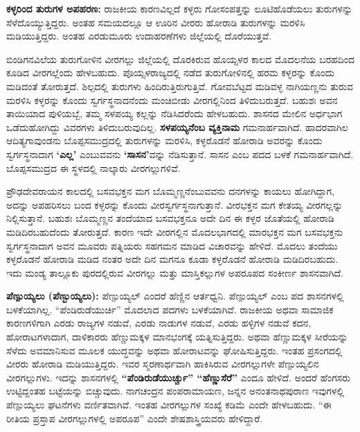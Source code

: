 \textbf{ಕಳ್ಳರಿಂದ ತುರುಗಳ ಅಪಹರಣ: } ರಾಜಕೀಯ ಕಾರಣವಿಲ್ಲದೆ ಕಳ್ಳರು ಗೋಸಂಪತ್ತನ್ನು ಲೂಟಿಹೊಡೆಯಲು ತುರುಗಳನ್ನು ಸೆಳೆದೊಯ್ಯುತ್ತಿದ್ದರು. ಅಂತಹ ಸಮಯದಲ್ಲೂ ಆ ಊರಿನ ವೀರರು ಹೋರಾಡಿ ತುರುಗಳನ್ನು ಮರಳಿಸಿ ಮಡಿಯುತ್ತಿದ್ದರು. ಅಂತಹ ಎರಡುಮೂರು ಉದಾಹರಣೆಗಳು ಜಿಲ್ಲೆಯಲ್ಲಿ ದೊರೆಯುತ್ತವೆ.

ಬಿಂಡಿಗನವಿಲೆಯ ತುರುಗೋಳಿನ ವೀರಗಲ್ಲು ಜಿಲ್ಲೆಯಲ್ಲಿ ದೊರಕಿರುವ ಹೊಯ್ಸಳರ ಕಾಲದ ಮೊದಲನೆಯ ಬರಹದಿಂದ ಕೂಡಿದ ವೀರಗಲ್ಲೆಂದು ಹೇಳಬಹುದು. ಪೊಯ್ಸಳರಾಜ್ಯದಲ್ಲಿ ನಡೆದ ತುರುಗೋಳಿನಲ್ಲಿ ಹರಮ ಕಳ್ಳರನ್ನು ಕೊಂದು ಮಡಿದಂತೆ ತೋರುತ್ತದೆ. ಶಿಲ್ಪದಲ್ಲಿ ತುರುಗಳು ಹಿಂದಿರುತ್ತಿರುಗುತ್ತಿವೆ. ಗೋವಬೆಟ್ಟದ ಮಡಿವಳ್ಳ ನಾಗಿಯಣ್ಣನು ತುರುವ ಮರಳಿಸಿ ಕಳ್ಳರನ್ನು ಕೊಂದು ಸ್ವರ್ಗಸ್ಥನಾದನೆಂದು ಮಂಚಿಬೀಡು ವೀರಗಲ್ಲಿನಿಂದ ತಿಳಿದುಬರುತ್ತದೆ. ಬಹುಶಃ ಅವನ ತಾಯಿಯಾದ ಪುಳಿಯಬ್ಬೆ, ತಮ್ಮ ಸಳಪಯ್ಯ ಕಲ್ಲನ್ನು ನೆಡಿಸಿದರೆಂದು ಹೇಳಬಹುದು. ಶಾಸನದ ಮೇಲಿನ ಅರ್ಧಭಾಗ ಒಡೆದುಹೋಗಿದ್ದು ವಿವರಗಳು ತಿಳಿದುಬರುವುದಿಲ್ಲ. \textbf{ಸಳಪಯ್ಯನೆಂಬ ವ್ಯಕ್ತಿನಾಮ} ಗಮನಾರ್ಹವಾಗಿದೆ. ಹಾದರವಾಗಿಲ ಆದಿತ್ಯಗಾವುಂಡನು ಬೊಪ್ಪಸಮುದ್ರದಲ್ಲಿ ತುರುಗಳನ್ನು ಮರಳಿಸಿ, ಕಳ್ಳರೊಡನೆ ಹೋರಾಡಿ ಅವರನ್ನು ಕೊಂದು ಸ್ವರ್ಗಸ್ಥನಾದಾಗ \textbf{‘ಎಲ್ಲ’} ಎಂಬುವವನು \textbf{‘ಸಾಸನ’}ವನ್ನು ನೆಡಿಸುತ್ತಾನೆ. ಸಾಸನ ಎಂಬ ಪದದ ಬಳಕೆ ಗಮನಾರ್ಹವಾಗಿದೆ. ಬೊಪ್ಪಸಮುದ್ರದ ಈ ಸ್ಥಳದಲ್ಲಿ ನಾಲ್ಕಾರು ವೀರಗಲ್ಲುಗಳಿವೆ.

ಪ್ರೌಢದೇವರಾಯನ ಕಾಲದಲ್ಲಿ ಬಸವಭಕ್ತನ ಮಗ ಬೊಮ್ಮಣ್ಣನೆಂಬುವವನು ದನಗಳನ್ನು ಕಾಯಲು ಹೋಗಿದ್ದಾಗ, ಅದನ್ನು ಅಪಹರಿಸಲು ಬಂದ ಕಳ್ಳರನ್ನು ಕೊಂದು ವೀರಸ್ವರ್ಗಸ್ಥನಾಗುತ್ತಾನೆ. ವೀರಭಕ್ತನ ಮಗ ಕೇತಯ್ಯ ವೀರಗಲ್ಲನ್ನು ನಿಲ್ಲಿಸುತ್ತಾನೆ. ಬಹುಶಃ ಬೊಮ್ಮಣ್ಣನ ತಂದೆಯಾದ ಬಸವಭಕ್ತನೂ ಅದೇ ದಿನ ಈ ಕಳ್ಳರ ಜೊತೆಯಲ್ಲಿ ಹೋರಾಡಿ ಮಡಿದಿರಬಹುದೆಂದು ತೋರುತ್ತದೆ. ಕಾರಣ ಇದೇ ವೀರಗಲ್ಲಿನ ಮೊದಲಭಾಗದಲ್ಲಿ ಮಾರಭಕ್ತನ ಮಗ ಬಸವಭಕ್ತನು ಸ್ವರ್ಗಸ್ಥನಾದಾಗ ಅವನ ಮೂವರು ಪತ್ನಿಯರು ಸಹಗಮನ ಮಾಡಿದ ವಿಚಾರವನ್ನು ಹೇಳಿದೆ. ಮೊದಲು ತಂದೆಯು ಕಳ್ಳರೊಡನೆ ಹೋರಾಡಿ ಮಡಿದ ನಂತರ ಅದೇ ದಿನ ಮಗನೂ ಕೂಡಾ ಕಳ್ಳರೊಡನೆ ಹೋರಾಡಿ ಮಡಿದಿರಬಹುದು. ಇದು ಮಂಡ್ಯ ತಾಲ್ಲೂಕು ಪುರದಲ್ಲಿರುವ ವೀರಗಲ್ಲು ಮತ್ತು ಮಾಸ್ತಿಕಲ್ಲುಗಳ ಅಪರೂಪದ ಸಂಕೀರ್ಣ ಶಾಸನವಾಗಿದೆ.

\textbf{ಪೆಣ್ಪುಯ್ಯಲು (ಪೆಣ್ಬುಯ್ಯಲು): } ಪೆಣ್ಪುಯ್ಯಲ್​ ಎಂದರೆ ಹೆಣ್ಣಿನ ಆರ್ತಧ್ವನಿ. ಪೆಣ್ಪುಯ್ಯಲ್​ ಎಂಬ ಪದ ಶಾಸನಗಳಲ್ಲಿ ಬಳಕೆಯಾಗಿಲ್ಲ. “ಪೆಂಡಿರುಡೆಯುರ್ಚಿ” ಮೊದಲಾದ ಪದಗಳು ಬಳಕೆಯಾಗಿವೆ. ರಾಜಕೀಯ ಅಥವಾ ಸಾಮಾಜಿಕ ಕಾರಣಗಳಿಗಾಗಿ ಎರಡು ರಾಜ್ಯಗಳ ನಡುವೆ, ಎರಡು ನಾಡುಗಳ ನಡುವೆ, ಎರಡು ಹಳ್ಳಿಗಳ ನಡುವೆ ಕದನ, ಹೋರಾಟಗಳಾದಾಗ, ದಾಳಿಕಾರರು ಹೆಣ್ಣುಮಕ್ಕಳ ಮಾನಭಂಗಕ್ಕೆ ಯತ್ನಿಸುತ್ತಿದ್ದರು. ಅಥವಾ ಹೆಣ್ಣುಮಕ್ಕಳ ಸೀರೆಯನ್ನು ಸೆಳೆದು ಅವಮಾನಿಸುವ ಮೂಲಕ ಯುದ್ಧವನ್ನು ಅಥವಾ ಹೋರಾಟವನ್ನು ಘೋಷಿಸುತ್ತಿದ್ದರು. ಇಂತಹ ಪ್ರಸಂಗದಲ್ಲಿ ವೀರರು ಹೋರಾಡಿ ಮಡಿಯುತ್ತಿದ್ದರು. ಇವರ ಸ್ಮರಣಾರ್ಥವಾಗಿ ಹಾಕಿಸಿರುವ ವೀರಗಲ್ಲುಗಳೇ ಪೆಣ್ಪುಯ್ಯಲಿನ ವೀರಗಲ್ಲುಗಳು. ಇದನ್ನು ಶಾಸನಗಳಲ್ಲಿ \textbf{“ಪೆಂಡಿರುಡೆಯುರ್ಚ್ಚು” “ಹೆಣ್ಣುಸೆರೆ”} ಎಂದೂ ಹೇಳಿದೆ. ಅಂದರೆ ಹೆಂಗಸರು ಉಟ್ಟಿದ್ದಂತಹ ಬಟ್ಟೆಯನ್ನು ಬಿಚ್ಚುವುದು. ನಾಗಚಂದ್ರನ ಪಂಪರಾಮಾಯಣ, ಜನ್ನನ ಅನಂತನಾಥಪುರಾಣ ಇವುಗಳಲ್ಲಿ ಪೆಣ್ಪುಯ್ಯಲು ಘಟನೆಗಳು ವರ್ಣಿತವಾಗಿವೆ. ಇಂತಹ ವೀರಗಲ್ಲುಗಳ ಸಂಖ್ಯೆ ಕಡಿಮೆ ಎಂದೇ ಹೇಳಬಹುದು. “ಈ ರೀತಿಯ ಪ್ರಸ್ತಾಪ ವೀರಗಲ್ಲುಗಳಲ್ಲಿ ಅಪರೂಪ” ಎಂದೇ ಶೇಷಶಾಸ್ತ್ರಿಯವರು ಹೇಳಿದ್ದಾರೆ.

